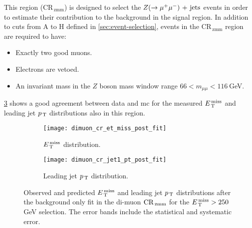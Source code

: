 This region (CR$_\mathrm{\, zmm}$) is designed to select the $Z (\rightarrow \mu^+ \mu^-)\mathrm{~+~jets}$
events in order to estimate their contribution to the background in the signal
region. In addition to cuts from A to H defined in \cref{sec:event-selection},
events in the CR$_\mathrm{\, zmm}$ region are required to have:
\begin{itemize}
\item Exactly two good muons.
\item Electrons are vetoed.
\item An invariant mass in the $Z$ boson mass window range
  $66 < m_{\mu \mu} < 116~$GeV.
\end{itemize}
\cref{fig:dimuon_cr_plots}
shows a good agreement between data and \gls{mc} for the measured $E_\mathrm{\, T}^\mathrm{\, miss}$ and
leading jet $p_\mathrm{\, T}$ distributions also in this region.
\begin{figure}[!htb]
  \centering
  \begin{subfigure}[t]{.48\linewidth}
    \texttt{[image: dimuon\_cr\_et\_miss\_post\_fit]}
    \caption{$E_\mathrm{\, T}^\mathrm{\, miss}$ distribution.}
    \label{fig:dimuon_cr_et_miss_pre_fit}
  \end{subfigure}
  \begin{subfigure}[t]{.48\linewidth}
    \texttt{[image: dimuon\_cr\_jet1\_pt\_post\_fit]}
    \caption{Leading jet $p_\mathrm{\, T}$ distribution.}
    \label{fig:dimuon_cr_jet1_pt_pre_fit}
  \end{subfigure}
  \caption{Observed and predicted $E_\mathrm{\, T}^\mathrm{\, miss}$ and leading jet $p_\mathrm{\, T}$ distributions
    after the background only fit in the di-muon $\mathrm{CR}_\mathrm{\, zmm}$ for the
    $E_\mathrm{\, T}^\mathrm{\, miss} > 250~$GeV selection. The error bands include the statistical and
    systematic error.}
  \label{fig:dimuon_cr_plots}
\end{figure}

